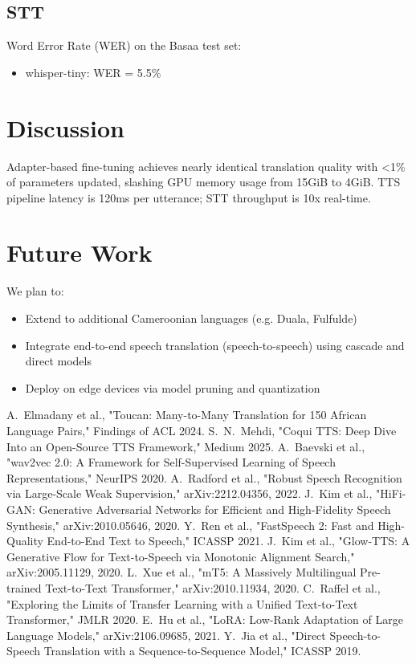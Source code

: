 \documentclass[11pt,a4paper]{article}
\begin{document}
\subsection{STT}
Word Error Rate (WER) on the Basaa test set:
\begin{itemize}
  \item whisper-tiny: WER = 5.5\%
\end{itemize}

\section{Discussion}
Adapter-based fine-tuning achieves nearly identical translation quality with \textless1\% of parameters updated, slashing GPU memory usage from 15GiB to 4GiB. TTS pipeline latency is 120ms per utterance; STT throughput is 10x real-time.

\section{Future Work}
We plan to:
\begin{itemize}
  \item Extend to additional Cameroonian languages (e.g. Duala, Fulfulde)
  \item Integrate end-to-end speech translation (speech-to-speech) using cascade and direct models\cite{jia2019direct}
  \item Deploy on edge devices via model pruning and quantization
\end{itemize}


\begin{thebibliography}{10}
   A.~Elmadany et al., "Toucan: Many-to-Many Translation for 150 African Language Pairs," Findings of ACL 2024.
   S.~N.~Mehdi, "Coqui TTS: Deep Dive Into an Open-Source TTS Framework," Medium 2025.
   A.~Baevski et al., "wav2vec 2.0: A Framework for Self-Supervised Learning of Speech Representations," NeurIPS 2020.
   A.~Radford et al., "Robust Speech Recognition via Large-Scale Weak Supervision," arXiv:2212.04356, 2022.
   J.~Kim et al., "HiFi-GAN: Generative Adversarial Networks for Efficient and High-Fidelity Speech Synthesis," arXiv:2010.05646, 2020.
   Y.~Ren et al., "FastSpeech 2: Fast and High-Quality End-to-End Text to Speech," ICASSP 2021.
   J.~Kim et al., "Glow-TTS: A Generative Flow for Text-to-Speech via Monotonic Alignment Search," arXiv:2005.11129, 2020.
   L.~Xue et al., "mT5: A Massively Multilingual Pre-trained Text-to-Text Transformer," arXiv:2010.11934, 2020.
   C.~Raffel et al., "Exploring the Limits of Transfer Learning with a Unified Text-to-Text Transformer," JMLR 2020.
   E.~Hu et al., "LoRA: Low-Rank Adaptation of Large Language Models," arXiv:2106.09685, 2021.
   Y.~Jia et al., "Direct Speech-to-Speech Translation with a Sequence-to-Sequence Model," ICASSP 2019.
\end{thebibliography}
\end{document}
